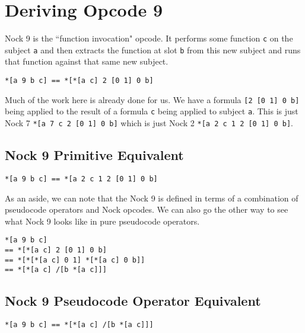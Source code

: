 \documentclass[twoside]{article}
\begin{document}
\section{Deriving Opcode 9}

Nock 9 is the ``function invocation" opcode. It performs some function \lstinline[style=inlinecode]{c} on the subject \lstinline[style=inlinecode]{a} and then extracts the function at slot \lstinline[style=inlinecode]{b} from this new subject and runs that function against that same new subject.

\begin{lstlisting}[style=listingcode]
*[a 9 b c] == *[*[a c] 2 [0 1] 0 b]
\end{lstlisting}

Much of the work here is already done for us. We have a formula \lstinline[style=inlinecode]{[2 [0 1] 0 b]} being applied to the result of a formula \lstinline[style=inlinecode]{c} being applied to subject \lstinline[style=inlinecode]{a}. This is just Nock 7 \lstinline[style=inlinecode]{*[a 7 c 2 [0 1] 0 b]} which is just Nock 2
\lstinline[style=inlinecode]{*[a 2 c 1 2 [0 1] 0 b]}.

\subsection*{Nock 9 Primitive Equivalent}

\begin{lstlisting}[style=listingcode]
*[a 9 b c] == *[a 2 c 1 2 [0 1] 0 b]
\end{lstlisting}

As an aside, we can note that the Nock 9 is defined in terms of a combination of pseudocode operators and Nock opcodes. We can also go the other way to see what Nock 9 looks like in pure pseudocode operators.

\begin{lstlisting}[style=listingblock]
*[a 9 b c]
== *[*[a c] 2 [0 1] 0 b]
== *[*[*[a c] 0 1] *[*[a c] 0 b]]
== *[*[a c] /[b *[a c]]]
\end{lstlisting}

\subsection*{Nock 9 Pseudocode Operator Equivalent}

\begin{lstlisting}[style=listingcode]
*[a 9 b c] == *[*[a c] /[b *[a c]]]
\end{lstlisting}
\end{document}

